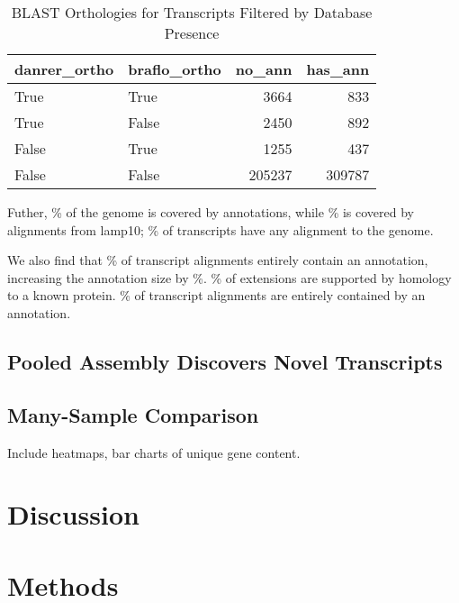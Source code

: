 \documentclass{article}
\begin{document}
\begin{table}[H]
\caption {BLAST Orthologies for Transcripts Filtered by Database Presence}
\begin{center}

\begin{tabular}{llrr}
\toprule
danrer\_ortho & braflo\_ortho &  no\_ann &  has\_ann \\
\midrule
        True &         True &    3664 &      833 \\
        True &        False &    2450 &      892 \\
       False &         True &    1255 &      437 \\
       False &        False &  205237 &   309787 \\
\bottomrule
\end{tabular}



\end{center}
\end{table}


Futher, \% of the genome is covered by annotations, while \% is covered by alignments from lamp10; \% of transcripts have any alignment to the genome.

We also find that \% of transcript alignments entirely contain an annotation, increasing the annotation size by \%. \% of extensions are supported by homology to a known protein. \% of transcript alignments are entirely contained by an annotation.


\subsection*{Pooled Assembly Discovers Novel Transcripts}

\subsection*{Many-Sample Comparison}

Include heatmaps, bar charts of unique gene content.

\section*{Discussion}

\section*{Methods}

\end{document}

